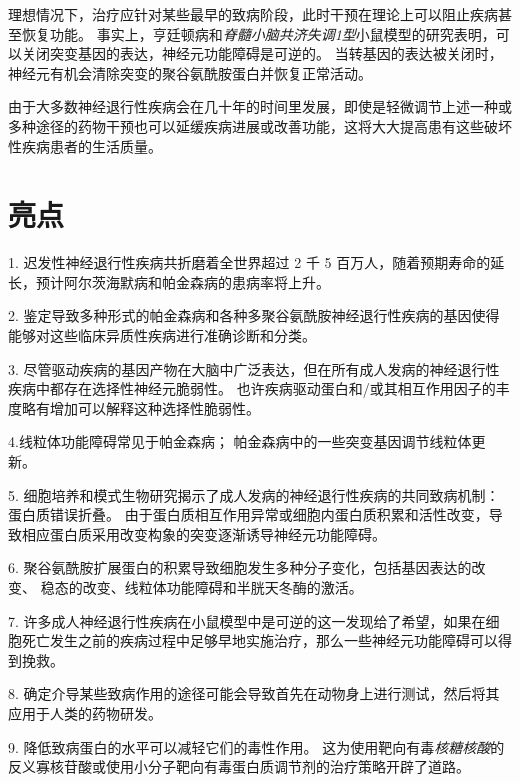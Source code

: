 理想情况下，治疗应针对某些最早的致病阶段，此时干预在理论上可以阻止疾病甚至恢复功能。
事实上，亨廷顿病和\textit{脊髓小脑共济失调1型}小鼠模型的研究表明，可以关闭突变基因的表达，神经元功能障碍是可逆的。
当转基因的表达被关闭时，神经元有机会清除突变的聚谷氨酰胺蛋白并恢复正常活动。


由于大多数神经退行性疾病会在几十年的时间里发展，即使是轻微调节上述一种或多种途径的药物干预也可以延缓疾病进展或改善功能，这将大大提高患有这些破坏性疾病患者的生活质量。



\section{亮点}

1. 迟发性神经退行性疾病共折磨着全世界超过 2 千 5 百万人，随着预期寿命的延长，预计阿尔茨海默病和帕金森病的患病率将上升。 


2. 鉴定导致多种形式的帕金森病和各种多聚谷氨酰胺神经退行性疾病的基因使得能够对这些临床异质性疾病进行准确诊断和分类。


3. 尽管驱动疾病的基因产物在大脑中广泛表达，但在所有成人发病的神经退行性疾病中都存在选择性神经元脆弱性。
也许疾病驱动蛋白和/或其相互作用因子的丰度略有增加可以解释这种选择性脆弱性。


4.线粒体功能障碍常见于帕金森病；
帕金森病中的一些突变基因调节线粒体更新。


5. 细胞培养和模式生物研究揭示了成人发病的神经退行性疾病的共同致病机制：蛋白质错误折叠。
由于蛋白质相互作用异常或细胞内蛋白质积累和活性改变，导致相应蛋白质采用改变构象的突变逐渐诱导神经元功能障碍。


6. 聚谷氨酰胺扩展蛋白的积累导致细胞发生多种分子变化，包括基因表达的改变、 稳态的改变、线粒体功能障碍和半胱天冬酶的激活。


7. 许多成人神经退行性疾病在小鼠模型中是可逆的这一发现给了希望，如果在细胞死亡发生之前的疾病过程中足够早地实施治疗，那么一些神经元功能障碍可以得到挽救。


8. 确定介导某些致病作用的途径可能会导致首先在动物身上进行测试，然后将其应用于人类的药物研发。


9. 降低致病蛋白的水平可以减轻它们的毒性作用。
这为使用靶向有毒\textit{核糖核酸}的反义寡核苷酸或使用小分子靶向有毒蛋白质调节剂的治疗策略开辟了道路。

